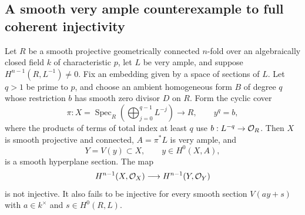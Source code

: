 \subsection{A smooth very ample counterexample to full coherent injectivity}

\begin{lemma}
\label{lem:A-cyclic-coherent-kernel}
Let $R$ be a smooth projective geometrically connected $n$-fold over an
algebraically closed field $k$ of characteristic $p$, let $L$ be very
ample, and suppose
$H^{n-1}(R,L^{-1})\ne0$. Fix an embedding given by a space of sections
of $L$. Let $q>1$ be prime to $p$, and choose an ambient homogeneous
form $B$ of degree $q$ whose restriction $b$ has smooth zero divisor
$D$ on $R$. Form the cyclic cover
\[
 \pi:X=\operatorname{Spec}_R\!
       \left(\bigoplus_{j=0}^{q-1}L^{-j}\right)\longrightarrow R,
 \qquad y^q=b,
\]
where the products of terms of total index at least $q$ use
$b:L^{-q}\to\mathcal O_R$. Then $X$ is smooth projective and connected,
$A=\pi^*L$ is very ample, and
\[
 Y=V(y)\subset X,\qquad y\in H^0(X,A),
\]
is a smooth hyperplane section. The map
\[
 H^{n-1}(X,\mathcal O_X)\longrightarrow H^{n-1}(Y,\mathcal O_Y)
\]
is not injective. It also fails to be injective for every smooth
section $V(a y+s)$ with $a\in k^\times$ and $s\in H^0(R,L)$.
\end{lemma}
